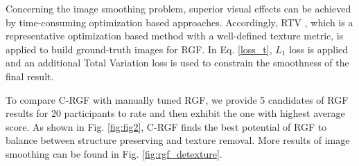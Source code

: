 \documentclass[twocolumn]{svjour3}          %
\begin{document}
Concerning the image smoothing problem, superior visual effects can be achieved by time-consuming optimization based approaches. Accordingly, RTV \cite{RTV}, which is a representative optimization based method with a well-defined texture metric, is applied to build ground-truth images for  RGF. In Eq. \ref{loss_t}, $L_{1}$ loss is applied and an additional Total Variation loss is used to constrain the smoothness of the final result.

To compare C-RGF with manually tuned RGF, we provide 5 candidates of RGF results for 20 participants to rate and then exhibit the one with highest average score. As shown in Fig. \ref{fig:fig2}, C-RGF finds the best potential of RGF to balance between structure preserving and texture removal. More results of image smoothing can be found in Fig. \ref{fig:rgf_detexture}.


\begin{figure*}[!th] 
\end{figure*}
\end{document}
